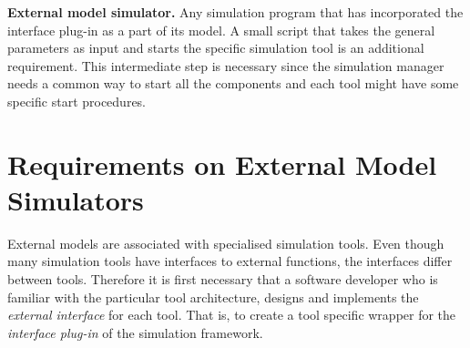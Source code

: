 \textbf{External model simulator.} Any simulation program that has incorporated
the interface plug-in as a part of its model. A small script that
takes the general parameters as input and starts the specific
simulation tool is an additional requirement. This intermediate step
is necessary since the simulation manager needs a common way
to start all the components and each tool might have some specific
start procedures.

\section{Requirements on External Model Simulators}
\label{sec:requirements}
External models are associated with specialised simulation tools. Even
though many simulation tools have interfaces to external functions, the
interfaces differ between tools. Therefore it is first necessary that
a software developer who is familiar with the particular tool
architecture, designs and implements the {\em external interface} for
each tool. That is, to create a tool specific wrapper for the {\em
interface plug-in} of the simulation framework.

